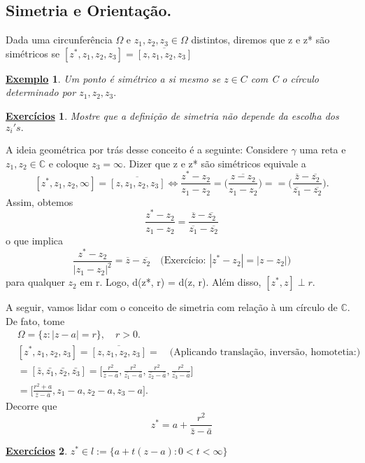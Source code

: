 \documentclass{article}
\newtheorem{example}{\underline{Exemplo}}[section]
\newtheorem*{exer*}{\underline{Exerc\'icios}}
\begin{document}
  \subsection{Simetria e Orienta\c c\~ao.}
  Dada uma circunfer\^encia $\Omega\text{ e }z_1, z_2, z_3\in \Omega$ distintos, diremos que z e z* s\~ao sim\'etricos se
  $[z^*, z_1, z_2, z_3] = \overline{[z, z_1, z_2, z_3]}$ 
 \begin{example}
   Um ponto \'e sim\'etrico a si mesmo se $z\in{C}$ com C o c\'irculo determinado por $z_1, z_2, z_3.$
 \end{example}
\begin{exer*}
  Mostre que a defini\c c\~ao de simetria n\~ao depende da escolha dos $z_{i}'s.$
\end{exer*}
  A ideia geom\'etrica por tr\'as desse conceito \'e a seguinte: Considere $\gamma$ uma reta e $z_1, z_2\in \mathbb{C}$
e coloque $z_3 = \infty.$ Dizer que z e z* s\~ao sim\'etricos equivale a
  $$
  [z^*, z_1, z_2, \infty] = \overline{[z, z_1, z_2, z_3]}\Longleftrightarrow \frac{z^* - z_2}{z_1 - z_2} = \overline{\biggl(\frac{z - z_2}{z_1 - z_2}\biggr)} =
  = \biggl(\frac{\overline{z} - \overline{z_2}}{\overline{z_1} - \overline{z_2}}\biggr).
  $$
  Assim, obtemos
  $$
  \frac{z^* - z_2}{z_1 - z_2} = \frac{\overline{z} - \overline{z_2}}{\overline{z_1} - \overline{z_2}} 
  $$
  o que implica
  $$
  \frac{z^* - z_2}{|z_1 - z_2|^2} = \overline{z} - \overline{z_2} \quad \text{(Exerc\'icio: } |z^* - z_2| = |z - z_2|)
  $$
  para qualquer $z_2$ em r. Logo, d(z*, r) = d(z, r). Al\'em disso, $[z^*, z]\perp{r}.$

  A seguir, vamos lidar com o conceito de simetria com rela\c c\~ao \`a um c\'irculo de $\mathbb{C}.$ De fato, tome
  \begin{align*}
  &\Omega = \{z: |z - a| = r\}, \quad r > 0. \\
  &[z^*, z_1, z_2, z_3] = \overline{[z, z_1, z_2, z_3]} = \quad \text{(Aplicando transla\c c\~ao, invers\~ao, homotetia:)} \\
  & = [\bar{z}, \bar{z_1}, \bar{z_2}, \bar{z_3}] = \biggl[\frac{r^2}{\bar{z} - \bar{a}}, \frac{r^2}{\bar{z_1} - \bar{a}}, \frac{r^2}{\bar{z_2} - \bar{a}}, \frac{r^2}{\bar{z_3} - \bar{a}}\biggr] \\
  & = \biggl[\frac{r^2 + a}{\bar{z} - \bar{a}}, z_1 - a, z_2 - a, z_3 - a\biggr].
  \end{align*}
  Decorre que 
  $$
  z^* = a + \frac{r^2}{\bar{z} - \bar{a}}
  $$
 \begin{exer*}
   $z^*\in{l}:= \{a + t(z-a): 0 < t < \infty\} $
 \end{exer*}
 \newpage
\end{document}
